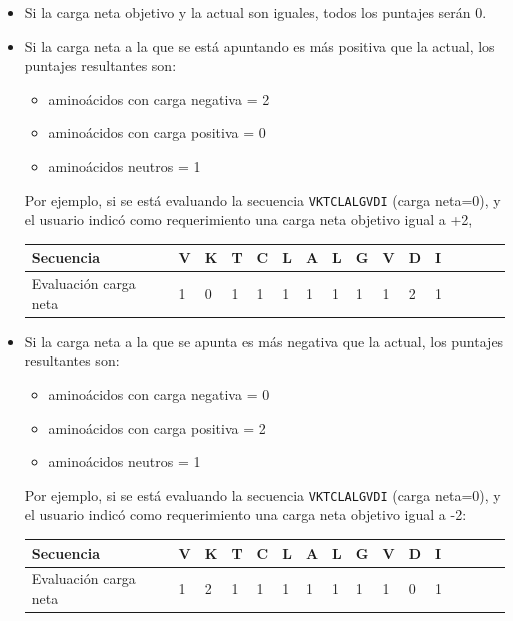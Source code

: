 \begin{itemize}
  \item Si la carga neta objetivo y la actual son iguales, todos los puntajes serán 0.
 
\item Si la carga neta a la que se está apuntando es más positiva que la actual, los puntajes resultantes son: 
  \begin{itemize}
   \item  aminoácidos con carga negativa = 2
  \item aminoácidos con carga positiva = 0
  \item aminoácidos neutros = 1
  \end{itemize}
Por ejemplo, si se está evaluando la secuencia \texttt{VKTCLALGVDI} (carga neta=0), y el usuario indicó como requerimiento una carga neta objetivo igual a +2, 
   
 
 \vspace{0.5cm}
\begin{center}
  \begin{tabular}{llllllllllllllll} 
\hline

Secuencia & \textbf{V} & \textbf{K} & \textbf{T} & \textbf{C} & \textbf{L} & \textbf{A} & \textbf{L} & \textbf{G} & \textbf{V} & \textbf{D} & \textbf{I} \\ \hline
Evaluación carga neta & 1 & 0 & 1 & 1 & 1 & 1 & 1 & 1 & 1 & 2 & 1  \\ \hline
\end{tabular}
\end{center}

 
 \item Si la carga neta a la que se apunta es más negativa que la actual, los puntajes resultantes son:
  \begin{itemize}
   \item  aminoácidos con carga negativa = 0
  \item aminoácidos con carga positiva = 2
  \item aminoácidos neutros = 1
  \end{itemize}

   Por ejemplo, si se está evaluando la secuencia \texttt{VKTCLALGVDI} (carga neta=0), y el usuario indicó como requerimiento una carga neta objetivo igual a -2:
   
   \vspace{0.5cm}

   \begin{center}
\begin{tabular}{llllllllllllllll} 
\hline
Secuencia & \textbf{V} & \textbf{K} & \textbf{T} & \textbf{C} & \textbf{L} & \textbf{A} & \textbf{L} & \textbf{G} & \textbf{V} & \textbf{D} & \textbf{I}\\ \hline
Evaluación carga neta & 1 & 2 & 1 & 1 & 1 & 1 & 1 & 1 & 1 & 0 & 1  \\ \hline
\end{tabular}

   \end{center}
   
\end{itemize}





